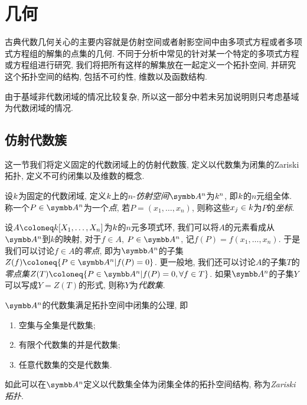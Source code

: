 
\section{几何}\label{sec:geometry}

古典代数几何关心的主要内容就是仿射空间或者射影空间中由多项式方程或者多项式方程组的解集的点集的几何. 不同于分析中常见的针对某一个特定的多项式方程或方程组进行研究, 我们将把所有这样的解集放在一起定义一个拓扑空间, 并研究这个拓扑空间的结构, 包括不可约性, 维数以及函数结构.

由于基域非代数闭域的情况比较复杂, 所以这一部分中若未另加说明则只考虑基域为代数闭域的情况.

\subsection{仿射代数簇}\label{sec:varietyaffine}

这一节我们将定义固定的代数闭域上的仿射代数簇, 定义以代数集为闭集的Zariski拓扑, 定义不可约闭集以及维数的概念.

设$k$为固定的代数闭域, 定义$k$上的$n$-\emph{仿射空间}$\AF^n$为$k^n$, 即$k$的$n$元组全体. 称一个$P\in \AF^n$为一个\emph{点}, 若$P=(x_1, \dotsc, x_n)$, 则称这些$x_j\in k$为$P$的\emph{坐标}.

设$A\coloneq \kk[X_1, \dotsc, X_n]$为$k$的$n$元多项式环, 我们可以将$A$的元素看成从$\AF^n$到$k$的映射, 对于$f\in A$, $P\in \AF^n$, 记$f(P)=f(x_1, \dotsc, x_n)$. 于是我们可以讨论$f\in A$的\emph{零点}, 即为$\AF^n$的子集$Z(f)\coloneq \{P\in \AF^n\vert f(P)=0\}$. 更一般地, 我们还可以讨论$A$的子集$T$的\emph{零点集}$Z(T)\coloneq \{P\in \AF^n\vert f(P)=0, \forall f\in T\}$. 如果$\AF^n$的子集$Y$可以写成$Y=Z(T)$的形式, 则称$Y$为\emph{代数集}.

\begin{proposition}\label{prop:affinezariskitopology}
    $\AF^n$的代数集满足拓扑空间中闭集的公理, 即
    \begin{enumerate}
        \item\label{enum:prop-zariski-topology-1} 空集与全集是代数集;
        \item\label{enum:prop-zariski-topology-2} 有限个代数集的并是代数集;
        \item\label{enum:prop-zariski-topology-3} 任意代数集的交是代数集.
    \end{enumerate}
    如此可以在$\AF^n$定义以代数集全体为闭集全体的拓扑空间结构, 称为\emph{Zariski拓扑}.
\end{proposition}

